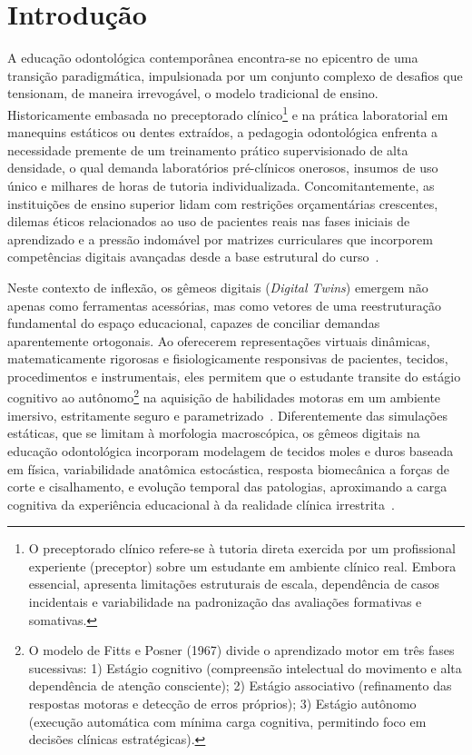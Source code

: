 \section{Introdução}
\label{sec:educacao-intro}

A educação odontológica contemporânea encontra-se no epicentro de uma transição paradigmática, impulsionada por um conjunto complexo de desafios que tensionam, de maneira irrevogável, o modelo tradicional de ensino. Historicamente embasada no preceptorado clínico\footnote{O preceptorado clínico refere-se à tutoria direta exercida por um profissional experiente (preceptor) sobre um estudante em ambiente clínico real. Embora essencial, apresenta limitações estruturais de escala, dependência de casos incidentais e variabilidade na padronização das avaliações formativas e somativas.} e na prática laboratorial em manequins estáticos ou dentes extraídos, a pedagogia odontológica enfrenta a necessidade premente de um treinamento prático supervisionado de alta densidade, o qual demanda laboratórios pré-clínicos onerosos, insumos de uso único e milhares de horas de tutoria individualizada. Concomitantemente, as instituições de ensino superior lidam com restrições orçamentárias crescentes, dilemas éticos relacionados ao uso de pacientes reais nas fases iniciais de aprendizado e a pressão indomável por matrizes curriculares que incorporem competências digitais avançadas desde a base estrutural do curso~\cite{duggal2026exploring}.


Neste contexto de inflexão, os gêmeos digitais (\textit{Digital Twins}) emergem não apenas como ferramentas acessórias, mas como vetores de uma reestruturação fundamental do espaço educacional, capazes de conciliar demandas aparentemente ortogonais. Ao oferecerem representações virtuais dinâmicas, matematicamente rigorosas e fisiologicamente responsivas de pacientes, tecidos, procedimentos e instrumentais, eles permitem que o estudante transite do estágio cognitivo ao autônomo\footnote{O modelo de Fitts e Posner (1967) divide o aprendizado motor em três fases sucessivas: 1) Estágio cognitivo (compreensão intelectual do movimento e alta dependência de atenção consciente); 2) Estágio associativo (refinamento das respostas motoras e detecção de erros próprios); 3) Estágio autônomo (execução automática com mínima carga cognitiva, permitindo foco em decisões clínicas estratégicas).} na aquisição de habilidades motoras em um ambiente imersivo, estritamente seguro e parametrizado~\cite{katsoulakis2024digital}. Diferentemente das simulações estáticas, que se limitam à morfologia macroscópica, os gêmeos digitais na educação odontológica incorporam modelagem de tecidos moles e duros baseada em física, variabilidade anatômica estocástica, resposta biomecânica a forças de corte e cisalhamento, e evolução temporal das patologias, aproximando a carga cognitiva da experiência educacional à da realidade clínica irrestrita~\cite{roy2025applications}.


